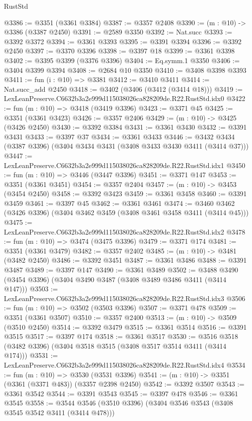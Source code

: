 \begin{lexlean}{RustStd}
\begin{coremodule}
@3386 := @3351 (@3361 @3384)
@3387 := @3357 @2408
@3390 := (m : @10) -> @3386 (@3387 @2450)
@3391 := @2589 @3350
@3392 := Nat.succ
@3393 := @3392 @3372
@3394 := @3361 @3393
@3395 := @3391 @3394
@3396 := @3392 @2450
@3397 := @3370 @3396
@3398 := @3397 @18
@3399 := @3361 @3398
@3402 := @3395 @3399 (@3376 @3396)
@3404 := Eq.symm.{1} @3350
@3406 := @3404 @3399 @3394
@3408 := @2684 @10 @3350
@3410 := @3408 @3398 @3393
@3411 := fun (i : @10) => @3381
@3412 := @3410 @3411
@3414 := Nat.succ_add @2450
@3418 := @3402 (@3406 (@3412 (@3414 @18)))
@3419 := LexLeanPreserve.C6632b3a2e999d115038026ca828209de.R22.RustStd.idx0
@3422 := fun (m : @10) => @3418 (@3419 @3396)
@3423 := @3371 @45
@3425 := @3351 (@3361 @3423)
@3426 := @3357 @2406
@3429 := (m : @10) -> @3425 (@3426 @2450)
@3430 := @3392 @3384
@3431 := @3361 @3430
@3432 := @3391 @3431
@3433 := @3397 @37
@3434 := @3361 @3433
@3446 := @3432 @3434 (@3387 @3396) (@3404 @3434 @3431 (@3408 @3433 @3430 @3411 (@3414 @37)))
@3447 := LexLeanPreserve.C6632b3a2e999d115038026ca828209de.R22.RustStd.idx1
@3450 := fun (m : @10) => @3446 (@3447 @3396)
@3451 := @3371 @147
@3453 := @3351 (@3361 @3451)
@3454 := @3357 @2404
@3457 := (m : @10) -> @3453 (@3454 @2450)
@3458 := @3392 @3423
@3459 := @3361 @3458
@3460 := @3391 @3459
@3461 := @3397 @45
@3462 := @3361 @3461
@3474 := @3460 @3462 (@3426 @3396) (@3404 @3462 @3459 (@3408 @3461 @3458 @3411 (@3414 @45)))
@3475 := LexLeanPreserve.C6632b3a2e999d115038026ca828209de.R22.RustStd.idx2
@3478 := fun (m : @10) => @3474 (@3475 @3396)
@3479 := @3371 @174
@3481 := @3351 (@3361 @3479)
@3482 := @3357 @2402
@3485 := (m : @10) -> @3481 (@3482 @2450)
@3486 := @3392 @3451
@3487 := @3361 @3486
@3488 := @3391 @3487
@3489 := @3397 @147
@3490 := @3361 @3489
@3502 := @3488 @3490 (@3454 @3396) (@3404 @3490 @3487 (@3408 @3489 @3486 @3411 (@3414 @147)))
@3503 := LexLeanPreserve.C6632b3a2e999d115038026ca828209de.R22.RustStd.idx3
@3506 := fun (m : @10) => @3502 (@3503 @3396)
@3507 := @3371 @478
@3509 := @3351 (@3361 @3507)
@3510 := @3357 @2400
@3513 := (m : @10) -> @3509 (@3510 @2450)
@3514 := @3392 @3479
@3515 := @3361 @3514
@3516 := @3391 @3515
@3517 := @3397 @174
@3518 := @3361 @3517
@3530 := @3516 @3518 (@3482 @3396) (@3404 @3518 @3515 (@3408 @3517 @3514 @3411 (@3414 @174)))
@3531 := LexLeanPreserve.C6632b3a2e999d115038026ca828209de.R22.RustStd.idx4
@3534 := fun (m : @10) => @3530 (@3531 @3396)
@3541 := (m : @10) -> @3351 (@3361 (@3371 @483)) (@3357 @2398 @2450)
@3542 := @3392 @3507
@3543 := @3361 @3542
@3544 := @3391 @3543
@3545 := @3397 @478
@3546 := @3361 @3545
@3558 := @3544 @3546 (@3510 @3396) (@3404 @3546 @3543 (@3408 @3545 @3542 @3411 (@3414 @478)))

\end{coremodule}
\end{lexlean}

